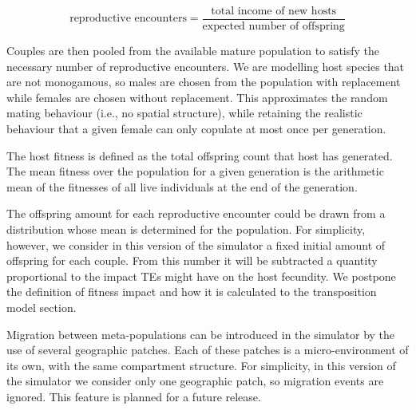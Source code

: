 \documentclass[10pt]{article}
\begin{document}
\begin{equation}
  \label{eq:couples}
  \mbox{reproductive encounters} = 
  \frac{\mbox{total income of new hosts}}
       {\mbox{expected number of offspring}} 
\end{equation}

Couples are then pooled from the available mature population to
satisfy the necessary number of reproductive encounters. We are
modelling host species that are not monogamous, so males are chosen
from the population with replacement while females are chosen without
replacement. This approximates the random mating behaviour (i.e., no
spatial structure), while retaining the realistic behaviour that a
given female can only copulate at most once per generation.


The host fitness is defined as the total offspring count that host has
generated. The mean fitness over the population for a given generation
is the arithmetic mean of the fitnesses of all live individuals at the
end of the generation.

The offspring amount for each reproductive encounter could be drawn
from a distribution whose mean is determined for the population. For
simplicity, however, we consider in this version of the simulator a
fixed initial amount of offspring for each couple. From this number it
will be subtracted a quantity proportional to the impact TEs might
have on the host fecundity. We postpone the definition of fitness
impact and how it is calculated to the transposition model section.

Migration between meta-populations can be introduced in the simulator
by the use of several geographic patches. Each of these patches is a
micro-environment of its own, with the same compartment structure. For
simplicity, in this version of the simulator we consider only one
geographic patch, so migration events are ignored. This feature is
planned for a future release.

\end{document}
